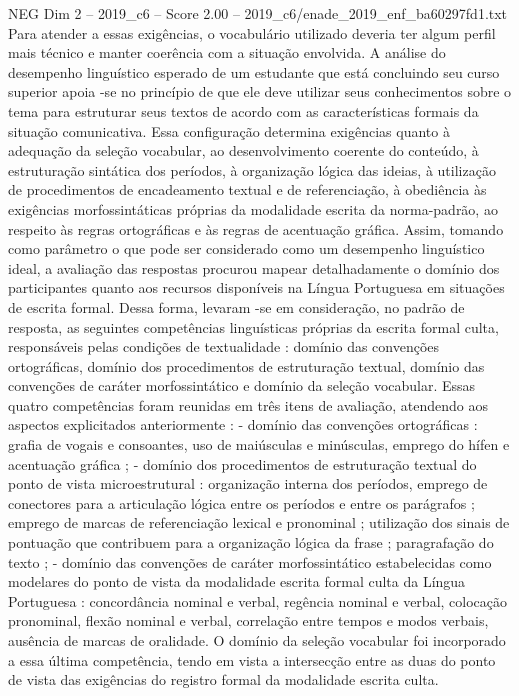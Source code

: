 \begin{textsample}{NEG Dim 2 – 2019\_c6 – Score 2.00 – 2019\_c6/enade\_2019\_enf\_ba60297fd1.txt}
Para atender a essas exigências, o vocabulário utilizado deveria ter algum perfil mais técnico e manter coerência com a situação envolvida.
A análise do desempenho linguístico esperado de um estudante que está concluindo seu curso superior apoia -se no princípio de que ele deve utilizar seus conhecimentos sobre o tema para estruturar seus textos de acordo com as características formais da situação comunicativa.
Essa configuração determina exigências quanto à adequação da seleção vocabular, ao desenvolvimento coerente do conteúdo, à estruturação sintática dos períodos, à organização lógica das ideias, à utilização de procedimentos de encadeamento textual e de referenciação, à obediência às exigências morfossintáticas próprias da modalidade escrita da norma-padrão, ao respeito às regras ortográficas e às regras de acentuação gráfica.
Assim, tomando como parâmetro o que pode ser considerado como um desempenho linguístico ideal, a avaliação das respostas procurou mapear detalhadamente o domínio dos participantes quanto aos recursos disponíveis na Língua Portuguesa em situações de escrita formal.
Dessa forma, levaram -se em consideração, no padrão de resposta, as seguintes competências linguísticas próprias da escrita formal culta, responsáveis pelas condições de textualidade : domínio das convenções ortográficas, domínio dos procedimentos de estruturação textual, domínio das convenções de caráter morfossintático e domínio da seleção vocabular.
Essas quatro competências foram reunidas em três itens de avaliação, atendendo aos aspectos explicitados anteriormente : - domínio das convenções ortográficas : grafia de vogais e consoantes, uso de maiúsculas e minúsculas, emprego do hífen e acentuação gráfica ; - domínio dos procedimentos de estruturação textual do ponto de vista microestrutural : organização interna dos períodos, emprego de conectores para a articulação lógica entre os períodos e entre os parágrafos ; emprego de marcas de referenciação lexical e pronominal ; utilização dos sinais de pontuação que contribuem para a organização lógica da frase ; paragrafação do texto ; - domínio das convenções de caráter morfossintático estabelecidas como modelares do ponto de vista da modalidade escrita formal culta da Língua Portuguesa : concordância nominal e verbal, regência nominal e verbal, colocação pronominal, flexão nominal e verbal, correlação entre tempos e modos verbais, ausência de marcas de oralidade.
O domínio da seleção vocabular foi incorporado a essa última competência, tendo em vista a intersecção entre as duas do ponto de vista das exigências do registro formal da modalidade escrita culta.

\end{textsample}
